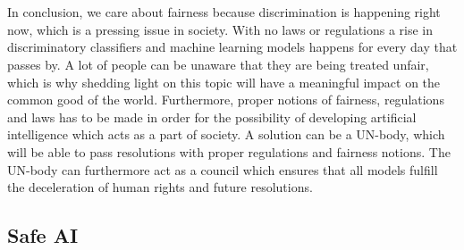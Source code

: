 \documentclass[11pt, fleqn, titlepage]{article}
\begin{document}
	\\\\
	In conclusion, we care about fairness because discrimination is happening right now, which is a pressing issue in society. With no laws or regulations a rise in discriminatory classifiers and machine learning models happens for every day that passes by. A lot of people can be unaware that they are being treated unfair, which is why shedding light on this topic will have a meaningful impact on the common good of the world. Furthermore, proper notions of fairness, regulations and laws has to be made in order for the possibility of developing artificial intelligence which acts as a part of society. A solution can be a UN-body, which will be able to pass resolutions with proper regulations and fairness notions. The UN-body can furthermore act as a council which ensures that all models fulfill the deceleration of human rights and future resolutions. 
	
	
	
	
	\subsection{Safe AI}
	
	

	
\end{document}
